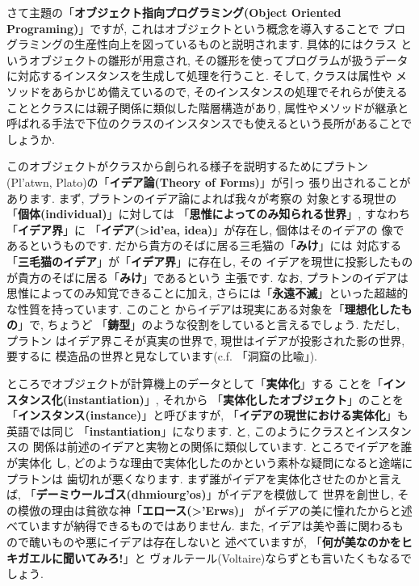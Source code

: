 さて主題の「\textbf{オブジェクト指向プログラミング(Object Oriented
 Programing)}」ですが, これはオブジェクトという概念を導入することで
プログラミングの生産性向上を図っているものと説明されます. 具体的にはクラス
というオブジェクトの雛形が用意され, その雛形を使ってプログラムが扱うデータ
に対応するインスタンスを生成して処理を行うこと. そして, クラスは属性や
メソッドをあらかじめ備えているので, そのインスタンスの処理でそれらが使える
こととクラスには親子関係に類似した階層構造があり, 属性やメソッドが継承と
呼ばれる手法で下位のクラスのインスタンスでも使えるという長所があることで
しょうか.
\newline


このオブジェクトがクラスから創られる様子を説明するためにプラトン
(\textgreek{Pl'atwn}, Plato)の「\textbf{イデア論(Theory of Forms)}」が引っ
張り出されることがあります. まず, プラトンのイデア論によれば我々が考察の
対象とする現世の「\textbf{個体(individual)}」に対しては
「\textbf{思惟によってのみ知られる世界}」, すなわち「\textbf{イデア界}」に
「\textbf{イデア(\textgreek{>id'ea}, idea)}」が存在し, 個体はそのイデアの
像であるというものです. だから貴方のそばに居る三毛猫の「\textbf{みけ}」には
対応する「\textbf{三毛猫のイデア}」が「\textbf{イデア界}」に存在し, その
イデアを現世に投影したものが貴方のそばに居る「\textbf{みけ}」であるという
主張です. なお, プラトンのイデアは思惟によってのみ知覚できることに加え,
 さらには「\textbf{永遠不滅}」といった超越的な性質を持っています. このこと
からイデアは現実にある対象を「\textbf{理想化したもの}」で, ちょうど
「\textbf{鋳型}」のような役割をしていると言えるでしょう. ただし, プラトン
はイデア界こそが真実の世界で, 現世はイデアが投影された影の世界, 要するに
模造品の世界と見なしています(c.f. 「洞窟の比喩」\cite{国家}).
\newline


ところでオブジェクトが計算機上のデータとして「\textbf{実体化}」する
ことを「\textbf{インスタンス化(instantiation)}」, それから
「\textbf{実体化したオブジェクト}」のことを
「\textbf{インスタンス(instance)}」と呼びますが, 
「\textbf{イデアの現世における実体化}」も英語では同じ
「\textbf{instantiation}」になります. と, このようにクラスとインスタンスの
関係は前述のイデアと実物との関係に類似しています. ところでイデアを誰が実体化
し, どのような理由で実体化したのかという素朴な疑問になると途端にプラトンは
歯切れが悪くなります. まず誰がイデアを実体化させたのかと言えば,
 「\textbf{デーミウールゴス(\textgreek{dhmiourg'os})}」がイデアを模倣して
世界を創世し, その模倣の理由は貧欲な神「\textbf{エロース(\textgreek{>'Erws})}」
がイデアの美に憧れたからと述べていますが納得できるものではありません.
 また, イデアは美や善に関わるもので醜いものや悪にイデアは存在しないと
述べていますが, 「\textbf{何が美なのかをヒキガエルに聞いてみろ!}」と
ヴォルテール(Voltaire)ならずとも言いたくもなるでしょう.
\newline



